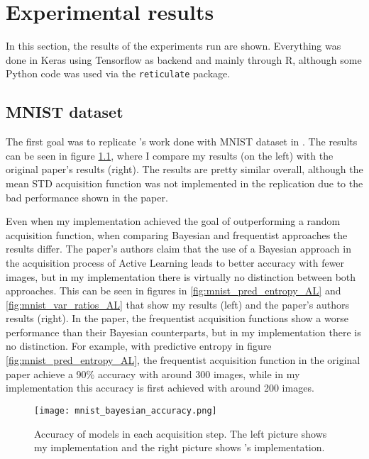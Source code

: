 
\chapter{Experimental results}
\label{ch:results}

In this section, the results of the experiments run are shown. Everything was done in Keras using Tensorflow as backend and mainly through R, although some Python code was used via the \texttt{reticulate} package.

\section{MNIST dataset}

The first goal was to replicate \citeauthor{Gal2016Active}'s work done with MNIST dataset in . The results can be seen in figure \ref{fig:mnist_comparison_active_learning_random}, where I compare my results (on the left) with the original paper's results (right). The results are pretty similar overall, although the mean STD acquisition function was not implemented in the replication due to the bad performance shown in the paper.

Even when my implementation achieved the goal of outperforming a random acquisition function, when comparing Bayesian and frequentist approaches the results differ. The paper's authors claim that the use of a Bayesian approach in the acquisition process of Active Learning leads to better accuracy with fewer images, but in my implementation there is virtually no distinction between both approaches. This can be seen in figures in \ref{fig:mnist_pred_entropy_AL} and \ref{fig:mnist_var_ratios_AL} that show my results (left) and the paper's authors results (right). In the paper, the frequentist acquisition functions show a worse performance than their Bayesian counterparts, but in my implementation there is no distinction. For example, with predictive entropy in figure \ref{fig:mnist_pred_entropy_AL}, the frequentist acquisition function in the original paper achieve a 90\% accuracy with around 300 images, while in my implementation this accuracy is first achieved with around 200 images.


\begin{figure}[H]
    \centering
    \texttt{[image: mnist\_bayesian\_accuracy.png]}
    \caption{Accuracy of models in each acquisition step. The left picture shows my implementation and the right picture shows \citeauthor{Gal2016Active}'s implementation.}
    \label{fig:mnist_comparison_active_learning_random}
\end{figure}

